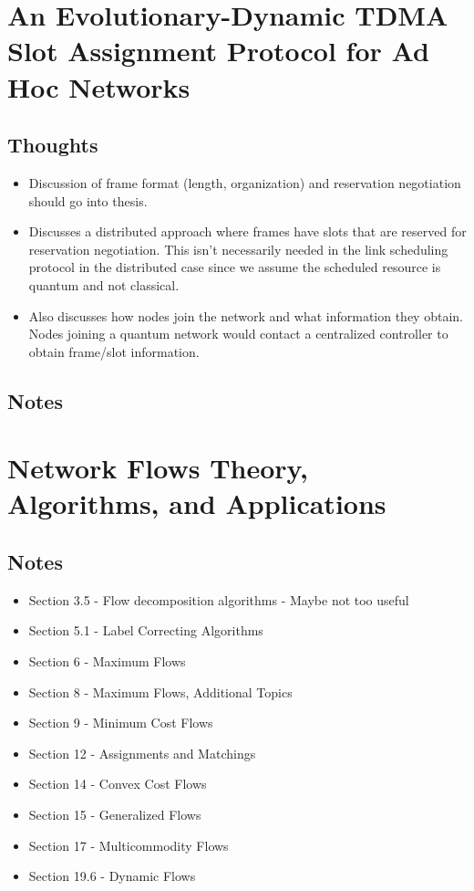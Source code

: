 \documentclass{article}
\begin{document}
\section{An Evolutionary-Dynamic TDMA Slot Assignment Protocol for Ad Hoc Networks}

\subsection{Thoughts}
\begin{itemize}
    \item Discussion of frame format (length, organization) and reservation negotiation should go into thesis.
    \item Discusses a distributed approach where frames have slots that are reserved for reservation negotiation.  This isn't necessarily needed in the link scheduling protocol in the distributed case since we assume the scheduled resource is quantum and not classical.
    \item Also discusses how nodes join the network and what information they obtain.  Nodes joining a quantum network would contact a centralized controller to obtain frame/slot information.
\end{itemize}

\subsection{Notes}

\section{Network Flows Theory, Algorithms, and Applications}

\subsection{Notes}
\begin{itemize}
    \item Section 3.5 - Flow decomposition algorithms - Maybe not too useful
    \item Section 5.1 - Label Correcting Algorithms
    \item Section 6 - Maximum Flows
    \item Section 8 - Maximum Flows,  Additional Topics
    \item Section 9 - Minimum Cost Flows
    \item Section 12 - Assignments and Matchings
    \item Section 14 - Convex Cost Flows
    \item Section 15 - Generalized Flows
    \item Section 17 - Multicommodity Flows
    \item Section 19.6 - Dynamic Flows
\end{itemize}
\end{document}
